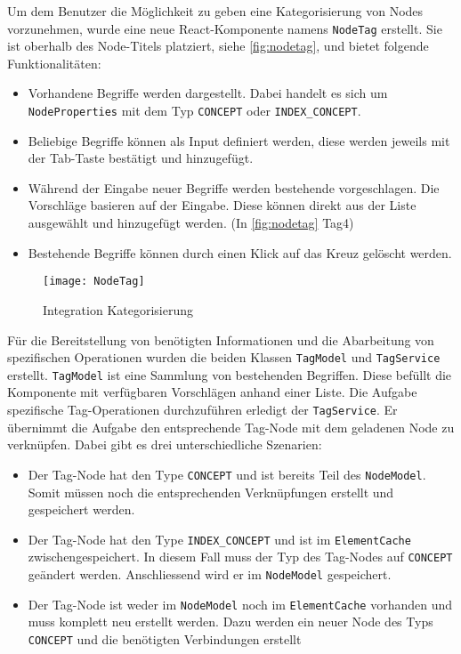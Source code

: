 Um dem Benutzer die Möglichkeit zu geben eine Kategorisierung von Nodes vorzunehmen, wurde eine neue \gls{React}-Komponente namens \texttt{NodeTag} erstellt. Sie ist oberhalb des Node-Titels platziert, siehe \autoref{fig:nodetag}, und bietet folgende Funktionalitäten:
\begin{itemize}
    \item Vorhandene Begriffe werden dargestellt. Dabei handelt es sich um \texttt{NodeProperties} mit dem Typ \texttt{CONCEPT} oder \verb|INDEX_CONCEPT|.\\
    \item Beliebige Begriffe können als Input definiert werden, diese werden jeweils mit der Tab-Taste bestätigt und hinzugefügt.\\ 
    \item Während der Eingabe neuer Begriffe werden bestehende vorgeschlagen. Die Vorschläge basieren auf der Eingabe. Diese kön\-nen direkt aus der Liste ausgewählt und hinzugefügt werden. (In \autoref{fig:nodetag} Tag4)\\
    \item Bestehende Begriffe können durch einen Klick auf das Kreuz gelöscht werden.\\
\end{itemize}

    \begin{figure}[H]
    \centering
    \texttt{[image: NodeTag]}
    \caption{Integration Kategorisierung}
    \label{fig:nodetag}
    \end{figure}

Für die Bereitstellung von benötigten Informationen und die Abarbeitung von spezifischen Operationen wurden die beiden Klassen \texttt{TagModel} und \texttt{TagService} erstellt. \texttt{TagModel} ist eine Sammlung von bestehenden Begriffen. Diese befüllt die Komponente mit ver\-füg\-bar\-en Vorschlägen anhand einer Liste. Die Aufgabe spezifische Tag-\-Op\-er\-a\-tion\-en durchzuführen erledigt der \texttt{TagService}. Er übernimmt die Aufgabe den entsprechende Tag-Node mit dem geladenen Node zu verknüpfen. Dabei gibt es drei unterschiedliche Szenarien:
\begin{itemize}
    \item Der Tag-Node hat den Type \texttt{CONCEPT} und ist bereits Teil des \texttt{NodeModel}. Somit müssen noch die entsprechenden Ver\-knüpf\-ung\-en erstellt und gespeichert werden.
    \item Der Tag-Node hat den Type \verb|INDEX_CONCEPT| und ist im \texttt{Ele\-ment\-Cache} zwischengespeichert. In diesem Fall muss der Typ des Tag-Nodes auf \texttt{CONCEPT} geändert werden. Anschliessend wird er im \texttt{NodeModel} gespeichert. 
    \item Der Tag-Node ist weder im \texttt{NodeModel} noch im \texttt{ElementCache} vorhanden und muss komplett neu erstellt werden. Dazu werden ein neuer Node des Typs \texttt{CONCEPT} und die benötigten Verbindungen erstellt
\end{itemize}
    
